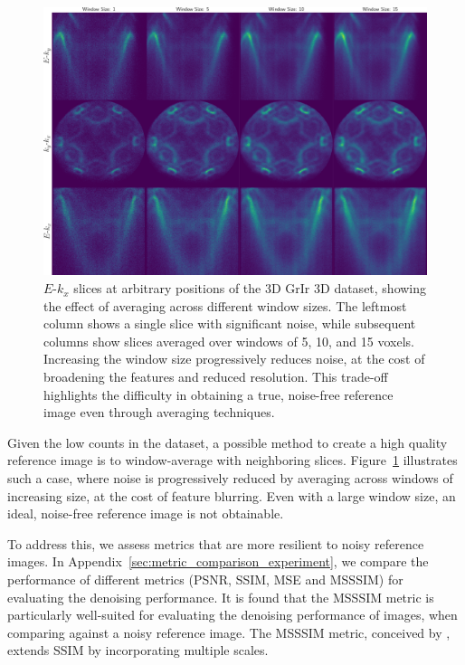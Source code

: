 \begin{figure}[h]
    \centering
    \includegraphics[width=1\linewidth]{images/slices.pdf}
    \caption{$E$-$k_x$ slices at arbitrary positions of the 3D \gls{GrIr} 3D dataset, showing the effect of averaging across different window sizes. The leftmost column shows a single slice with significant noise, while subsequent columns show slices averaged over windows of 5, 10, and 15 voxels. Increasing the window size progressively reduces noise, at the cost of broadening the features and reduced resolution. This trade-off highlights the difficulty in obtaining a true, noise-free reference image even through averaging techniques.}
    \label{fig:slices}
\end{figure}

Given the low counts in the dataset, a possible method to create a high quality reference image is to window-average with neighboring slices. Figure~\ref{fig:slices} illustrates such a case, where noise is progressively reduced by averaging across windows of increasing size, at the cost of feature blurring. Even with a large window size, an ideal, noise-free reference image is not obtainable.

To address this, we assess metrics that are more resilient to noisy reference images. In Appendix~\ref{sec:metric_comparison_experiment}, we compare the performance of different metrics (\gls{PSNR}, \gls{SSIM}, \gls{MSE} and \gls{MSSSIM}) for evaluating the denoising performance. It is found that the \gls{MSSSIM} metric is particularly well-suited for evaluating the denoising performance of images, when comparing against a noisy reference image. The \gls{MSSSIM} metric, conceived by \citeauthor{wangMultiscaleStructuralSimilarity2003} \cite{wangMultiscaleStructuralSimilarity2003}, extends SSIM by incorporating multiple scales. 

